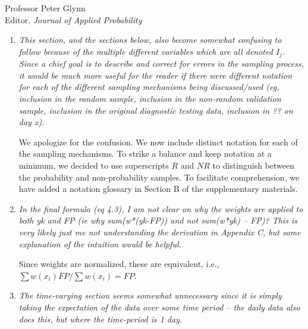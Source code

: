 \documentclass[11pt]{letter} %
\begin{document}
\begin{letter}{Professor
	Peter Glynn\\
	Editor, {\em Journal of Applied Probability}}
\begin{enumerate}
\begin{enumerate}
	Remark 5 in Section 4.1.1 discusses how the proposal is tied closely to the use of weights to correct for sampling bias.  Specifically, in epidemiology literature, the survey sampling weights and transportability weights require knowledge of the selection mechanism, which is not available in our setting.  Instead, we require auxiliary information in the form of a random sample to estimate the probability of selection. A key difference from prior approaches is the need to estimate time-varying probabilities of selection, e.g., Figure 6 shows how the selection propensity of young individuals changes dramatically over the observation window.
	\vspace{5mm}
	\item {\it This section, and the sections below, also become somewhat confusing to follow because of the multiple different variables which are all denoted $I_j$. Since a chief goal is to describe and correct for errors in the sampling process, it would be much more useful for the reader if there were different notation for each of the different sampling mechanisms being discussed/used (eg, inclusion in the random sample, inclusion in the non-random validation sample, inclusion in the original diagnostic testing data, inclusion in ?? on day x).}
	\vspace{5mm}

	We apologize for the confusion.  We now include distinct notation for each of the sampling mechanisms.  To strike a balance and keep notation at a minimum, we decided to use superscripts $R$ and $NR$ to distinguish between the probability and non-probability samples.  To facilitate comprehension, we have added a notation glossary in Section B of the supplementary materials.
	\vspace{5mm}
	\item {\it In the final formula (eq 4.3), I am not clear on why the weights are applied to both yk and FP (ie why sum(w*(yk-FP)) and not sum(w*yk) – FP)? This is very likely just me not understanding the derivation in Appendix C, but some explanation of the intuition would be helpful.}
	\vspace{5mm}

	Since weights are normalized, these are equivalent, i.e., $\sum w (x_i) FP / \sum w(x_i) = FP$.
	\vspace{5mm}
	\item {\it The time-varying section seems somewhat unnecessary since it is simply taking the expectation of the data over some time period – the daily data also does this, but where the time-period is 1 day. }
	\vspace{5mm}


\end{enumerate}
\end{enumerate}
\end{letter}
\end{document}
